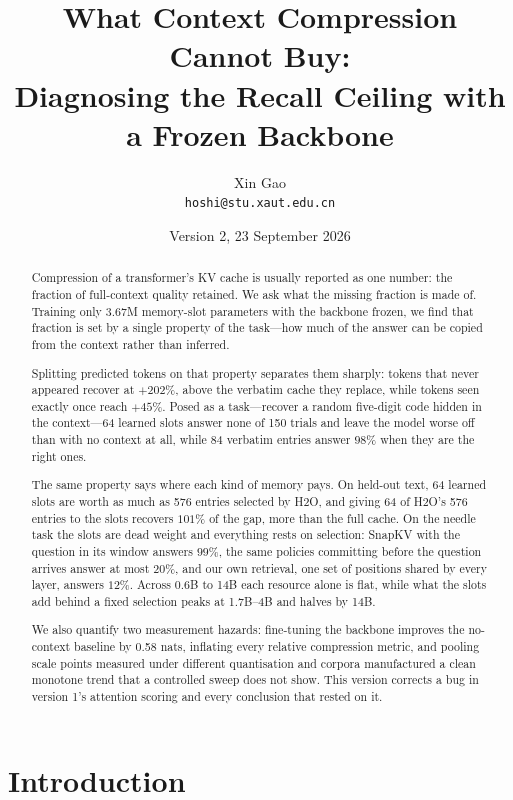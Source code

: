 \documentclass[11pt]{article}
\title{What Context Compression Cannot Buy:\\
       Diagnosing the Recall Ceiling with a Frozen Backbone}
\author{Xin Gao\\
  \texttt{hoshi@stu.xaut.edu.cn}}
\date{Version 2, 23 September 2026}
\begin{document}
\maketitle

\begin{abstract}
Compression of a transformer's KV cache is usually reported as one number: the
fraction of full-context quality retained. We ask what the missing fraction is
made of. Training only 3.67M memory-slot parameters with the backbone frozen,
we find that fraction is set by a single property of the task---how much of the
answer can be copied from the context rather than inferred.

Splitting predicted tokens on that property separates them sharply: tokens that
never appeared recover at $+202\%$, above the verbatim cache they replace, while
tokens seen exactly once reach $+45\%$. Posed as a task---recover a random
five-digit code hidden in the context---64 learned slots answer none of 150
trials and leave the model worse off than with no context at all, while 84
verbatim entries answer $98\%$ when they are the right ones.

The same property says where each kind of memory pays. On held-out text, 64
learned slots are worth as much as 576 entries selected by H2O, and giving 64 of
H2O's 576 entries to the slots recovers $101\%$ of the gap, more than the full
cache. On the needle task the slots are dead weight and everything rests on
selection: SnapKV with the question in its window answers $99\%$, the same
policies committing before the question arrives answer at most $20\%$, and our
own retrieval, one set of positions shared by every layer, answers $12\%$.
Across 0.6B to 14B each resource alone is flat, while what the slots add behind
a fixed selection peaks at 1.7B--4B and halves by 14B.

We also quantify two measurement hazards: fine-tuning the backbone improves the
no-context baseline by 0.58 nats, inflating every relative compression metric,
and pooling scale points measured under different quantisation and corpora
manufactured a clean monotone trend that a controlled sweep does not show.
This version corrects a bug in version 1's attention scoring and every
conclusion that rested on it.
\end{abstract}

\section{Introduction}
\end{document}
